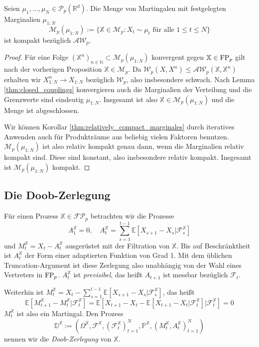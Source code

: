 \begin{corollary}
    Seien $\mu_1,...,\mu_N \in \mathcal{P}_p(\mathbb{R}^d)$. Die Menge von Martingalen mit festgelegten Marginalien $\mu_{1:N}$
    $$\mathcal{M}_p(\mu_{1:N}) := \{ \mathbb{X} \in \mathcal{M}_p: X_t \sim \mu_t \text{ für alle } 1\leq t \leq N\}$$
    ist kompakt bezüglich $\mathcal{AW}_p$.
\end{corollary}
\begin{proof}
    Für eine Folge $(\mathbb{X}^n)_{n\in \mathbb{N}} \subset \mathcal{M}_p(\mu_{1:N})$ konvergent gegen $\mathbb{X} \in \operatorname{FP}_p$ gilt nach der vorherigen Proposition $\mathbb{X} \in \mathcal{M}_p$. Da $\mathcal{W}_p(X, X^n) \leq \mathcal{AW}_p(\mathbb{X}, \mathbb{X}^n)$ erhalten wir $X^n_{1:N} \rightarrow X_{1:N}$ bezüglich $\mathcal{W}_p$, also insbesondere schwach. Nach Lemma \ref{thm:closed_couplings} konvergieren auch die Marginalien der Verteilung und die Grenzwerte sind eindeutig $\mu_{1:N}$. Insgesamt ist also $\mathbb{X} \in \mathcal{M}_p(\mu_{1:N})$ und die Menge ist abgeschlossen.

    Wir können Korollar \ref{thm:relatively_compact_marginales} durch iteratives Anwenden auch für Produkträume aus beliebig vielen Faktoren benutzen. $\mathcal{M}_p(\mu_{1:N})$ ist also relativ kompakt genau dann, wenn die Marginalien relativ kompakt sind. Diese sind konstant, also insbesondere relativ kompakt. Insgesamt ist $\mathcal{M}_p(\mu_{1:N})$ kompakt.
\end{proof}

\subsection{Die Doob-Zerlegung}
Für einen Prozess $\mathbb{X} \in \mathcal{FP}_p$ betrachten wir die Prozesse 
$$A_1^\mathbb{X}=0, \quad A_t^\mathbb{X} = \sum_{s=1}^{t-1} \mathbb{E}\left[ X_{s+1} - X_{s} \vert \mathcal{F}_{s}^\mathbb{X}\right]$$
und $M_t^\mathbb{X} = X_t - A_t^\mathbb{X}$ ausgerüstet mit der Filtration von $\mathbb{X}$. Bis auf Beschränktheit ist $A_t^\mathbb{X}$ der Form einer adaptierten Funktion von Grad 1. Mit dem üblichen Truncation-Argument ist diese Zerlegung also unabhängig von der Wahl eines Vertreters in $\operatorname{FP}_p$. $A_t^\mathbb{X}$ ist \emph{previsibel}, das heißt $A_{t+1}$ ist messbar bezüglich $\mathcal{F}_t$. 

Weiterhin ist $M_t^\mathbb{X} = X_t - \sum_{s=1}^{t-1}\mathbb{E}[X_{s+1} - X_{s} \vert \mathcal{F}_{s}^\mathbb{X}]$, das heißt 
$$\mathbb{E}\left[ M_{t+1}^\mathbb{X} - M_t^\mathbb{X} \vert \mathcal{F}_t^\mathbb{X}\right] = \mathbb{E}\left[ X_{t+1} - X_t - \mathbb{E}[X_{t+1} - X_t \vert \mathcal{F}_t^\mathbb{X}] \vert \mathcal{F}_t^\mathbb{X} \right] = 0$$
$M_t^\mathbb{X}$ ist also ein Martingal. Den Prozess 
$$\mathbb{D}^\mathbb{X} := \left( \Omega^\mathbb{X}, \mathcal{F}^\mathbb{X}, \left( \mathcal{F}_t^\mathbb{X}\right)_{t=1}^N, \mathbb{P}^\mathbb{X}, (M_t^\mathbb{X}, A_t^\mathbb{X})_{t=1}^N \right)$$
nennen wir die \emph{Doob-Zerlegung} von $\mathbb{X}$. 


